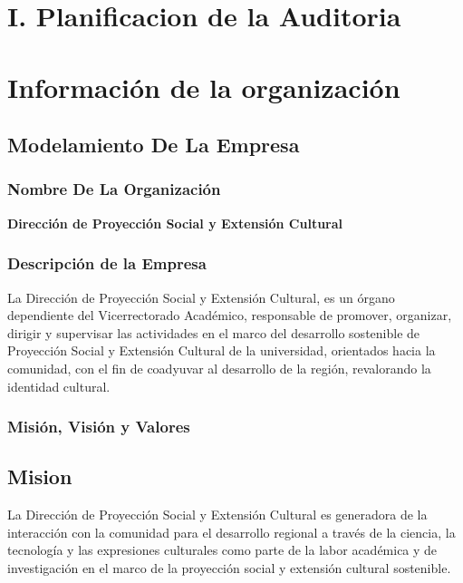 \documentclass[12pt,a4paper]{article}
\begin{document}

\tableofcontents %
\pagestyle{fancy} \mystyle \newpage %
\newcommand{\dpsec}{Dirección de Proyección Social y Extensión Cultural}


\section{I. Planificacion de la Auditoria}

\section{Información de la organización}
\subsection{Modelamiento De La Empresa}
\subsubsection{Nombre De La Organización}
\textbf{\dpsec}

\subsubsection{Descripción de la Empresa}
La Dirección de Proyección Social y Extensión Cultural, es un órgano dependiente del Vicerrectorado Académico, responsable de promover, organizar, dirigir y supervisar las actividades en el marco del desarrollo sostenible de Proyección Social y Extensión Cultural de la universidad, orientados hacia la comunidad, con el fin de coadyuvar al desarrollo de la región, revalorando la identidad cultural.

\subsubsection{Misión, Visión y Valores}
\subsection*{Mision}
La Dirección de Proyección Social y Extensión Cultural es generadora de la interacción con la comunidad para el desarrollo regional a través de la ciencia, la tecnología y las expresiones culturales como parte de la labor académica y de investigación en el marco de la proyección social y extensión cultural sostenible.
\end{document}
